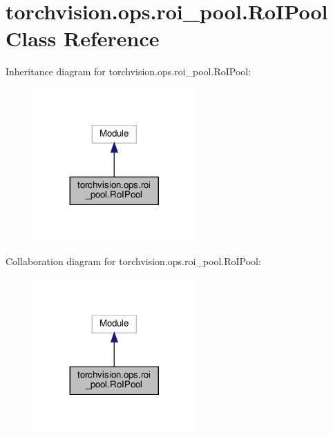 \hypertarget{classtorchvision_1_1ops_1_1roi__pool_1_1RoIPool}{}\section{torchvision.\+ops.\+roi\+\_\+pool.\+Ro\+I\+Pool Class Reference}
\label{classtorchvision_1_1ops_1_1roi__pool_1_1RoIPool}


Inheritance diagram for torchvision.\+ops.\+roi\+\_\+pool.\+Ro\+I\+Pool\+:
\nopagebreak
\begin{figure}[H]
\begin{center}
\leavevmode
\includegraphics[width=176pt]{classtorchvision_1_1ops_1_1roi__pool_1_1RoIPool__inherit__graph}
\end{center}
\end{figure}


Collaboration diagram for torchvision.\+ops.\+roi\+\_\+pool.\+Ro\+I\+Pool\+:
\nopagebreak
\begin{figure}[H]
\begin{center}
\leavevmode
\includegraphics[width=176pt]{classtorchvision_1_1ops_1_1roi__pool_1_1RoIPool__coll__graph}
\end{center}
\end{figure}
